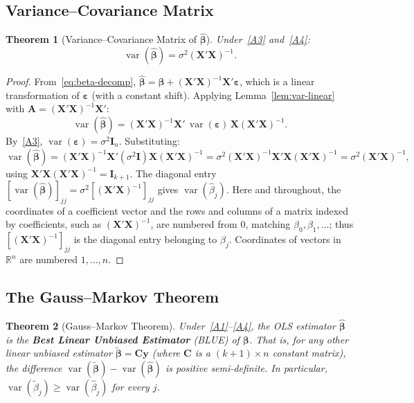 \documentclass[14pt]{extarticle}
\theoremstyle{plain}
\newtheorem{theorem}{Theorem}[section]
\theoremstyle{definition}
\theoremstyle{remark}
\DeclareMathOperator\var{var}
\newcommand{\bX}{\mathbf{X}}
\newcommand{\by}{\mathbf{y}}
\def\bb{\boldsymbol{\beta}}
\newcommand{\be}{\boldsymbol{\varepsilon}}
\newcommand{\bI}{\mathbf{I}}
\newcommand{\bA}{\mathbf{A}}
\newcommand{\bC}{\mathbf{C}}
\newcommand{\Real}{\mathbb{R}}
\begin{document}
\subsection{Variance--Covariance Matrix}

\begin{theorem}[Variance--Covariance Matrix of $\hat{\bb}$]\label{thm:var-beta}
Under~\ref{A3} and~\ref{A4}:
\begin{equation}
\boxed{\var(\hat{\bb}) = \sigma^2 (\bX'\bX)^{-1}.}
\end{equation}
\end{theorem}

\begin{proof}
From~\eqref{eq:beta-decomp}, $\hat{\bb} = \bb + (\bX'\bX)^{-1}\bX'\be$, which is a linear transformation of $\be$ (with a constant shift). Applying Lemma~\ref{lem:var-linear} with $\bA = (\bX'\bX)^{-1}\bX'$:
\[
\var(\hat{\bb}) = (\bX'\bX)^{-1}\bX'\,\var(\be)\,\bX(\bX'\bX)^{-1}.
\]
By~\ref{A3}, $\var(\be) = \sigma^2\bI_n$. Substituting:
\[
\var(\hat{\bb}) = (\bX'\bX)^{-1}\bX'(\sigma^2\bI)\bX(\bX'\bX)^{-1} = \sigma^2(\bX'\bX)^{-1}\bX'\bX(\bX'\bX)^{-1} = \sigma^2(\bX'\bX)^{-1},
\]
using $\bX'\bX(\bX'\bX)^{-1} = \bI_{k+1}$. The diagonal entry $[\var(\hat{\bb})]_{jj} = \sigma^2[(\bX'\bX)^{-1}]_{jj}$ gives $\var(\hat{\beta}_j)$. Here and throughout, the coordinates of a coefficient vector and the rows and columns of a matrix indexed by coefficients, such as $(\bX'\bX)^{-1}$, are numbered from $0$, matching $\beta_0, \beta_1, \ldots$; thus $[(\bX'\bX)^{-1}]_{jj}$ is the diagonal entry belonging to $\beta_j$. Coordinates of vectors in $\Real^n$ are numbered $1, \ldots, n$.
\end{proof}

\subsection{The Gauss--Markov Theorem}

\begin{theorem}[Gauss--Markov Theorem]\label{thm:gm}
Under~\ref{A1}--\ref{A4}, the OLS estimator $\hat{\bb}$ is the \textbf{Best Linear Unbiased Estimator} (BLUE) of $\bb$. That is, for any other linear unbiased estimator $\tilde{\bb} = \bC\by$ (where $\bC$ is a $(k+1) \times n$ constant matrix), the difference $\var(\tilde{\bb}) - \var(\hat{\bb})$ is positive semi-definite. In particular, $\var(\tilde{\beta}_j) \geqslant \var(\hat{\beta}_j)$ for every $j$.
\end{theorem}
\end{document}
